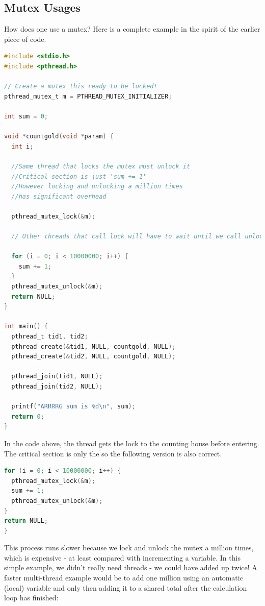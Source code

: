 \subsection{Mutex Usages}

How does one use a mutex?
Here is a complete example in the spirit of the earlier piece of code.

\begin{lstlisting}[language=C]
#include <stdio.h>
#include <pthread.h>

// Create a mutex this ready to be locked!
pthread_mutex_t m = PTHREAD_MUTEX_INITIALIZER;

int sum = 0;

void *countgold(void *param) {
  int i;

  //Same thread that locks the mutex must unlock it
  //Critical section is just 'sum += 1'
  //However locking and unlocking a million times
  //has significant overhead

  pthread_mutex_lock(&m);

  // Other threads that call lock will have to wait until we call unlock

  for (i = 0; i < 10000000; i++) {
    sum += 1;
  }
  pthread_mutex_unlock(&m);
  return NULL;
}

int main() {
  pthread_t tid1, tid2;
  pthread_create(&tid1, NULL, countgold, NULL);
  pthread_create(&tid2, NULL, countgold, NULL);

  pthread_join(tid1, NULL);
  pthread_join(tid2, NULL);

  printf("ARRRRG sum is %d\n", sum);
  return 0;
}
\end{lstlisting}

In the code above, the thread gets the lock to the counting house before entering.
The critical section is only the  so the following version is also correct.

\begin{lstlisting}[language=C]
for (i = 0; i < 10000000; i++) {
  pthread_mutex_lock(&m);
  sum += 1;
  pthread_mutex_unlock(&m);
}
return NULL;
}
\end{lstlisting}

This process runs slower because we lock and unlock the mutex a million times, which is expensive - at least compared with incrementing a variable.
In this simple example, we didn't really need threads - we could have added up twice!
A faster multi-thread example would be to add one million using an automatic (local) variable and only then adding it to a shared total after the calculation loop has finished:

